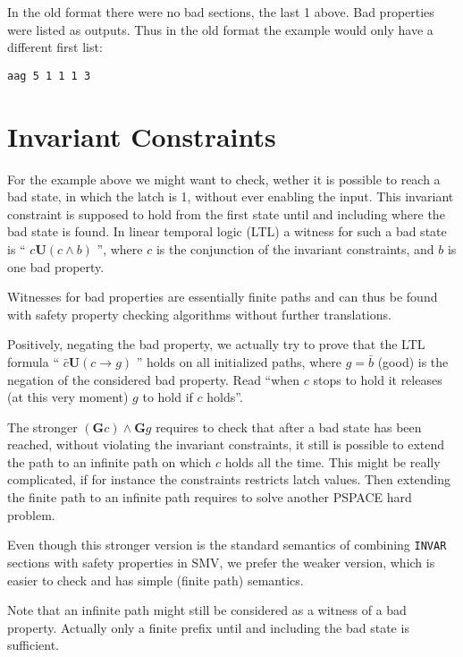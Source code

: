 \documentclass{llncs}
\begin{document}
In the old format there were no bad sections, the last 1 above.  Bad
properties were listed as outputs.  Thus in the old format the example would
only have a different first list:
{\small
\begin{verbatim}
aag 5 1 1 1 3
\end{verbatim}}

\section{Invariant Constraints}

For the example above we might want to check, wether it is possible to reach
a bad state, in which the latch is 1, without ever enabling the input.
This invariant constraint is supposed to hold from the first state
until and including where the bad state is found.  In linear temporal logic
(LTL) a witness for such a bad state is 
`` $ \mathit{c} \mathrel{\mathbf{U}} (c \wedge b) $ '',
where $c$ is the conjunction of the invariant constraints, and $b$ is
one bad property.  

Witnesses for bad properties are essentially finite paths
and can thus be found with safety property checking algorithms without
further translations.

Positively, negating the bad property, we actually try to prove that the LTL
formula
`` $ \mathit{\bar c} \mathrel{\mathbf{U}} (c \to g) $ '' holds on
all initialized paths, where $g = \bar b$ (good) is the negation of the
considered bad property.  Read ``when $c$ stops to hold it releases
(at this very moment) $g$ to hold if $c$ holds''.

The stronger $(\mathrel{\mathbf{G}} c) \wedge
 \mathrel{\mathbf{G}}g$ requires to check that after a bad state has been
reached, without violating the invariant constraints, it still is possible
to extend the path to an infinite path on which $c$ holds all the time.
This might be really complicated, if for instance the constraints restricts
latch values.  Then extending the finite path to an infinite path requires
to solve another PSPACE hard problem.

Even though this stronger version is the standard semantics of combining
\texttt{INVAR} sections with safety properties in SMV, we prefer the weaker
version, which is easier to check and has simple (finite path) semantics.

Note that an infinite path might still be considered as a witness of a bad
property.  Actually only a finite prefix until and including the bad state
is sufficient.
\end{document}
